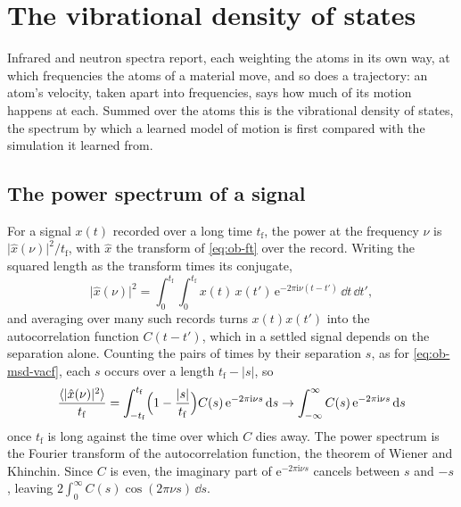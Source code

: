 \section{The vibrational density of states}
\label{sec:ob-vdos}

Infrared and neutron spectra report, each weighting the atoms in its own
way, at which frequencies the atoms of a material move, and so does a
trajectory: an atom's velocity, taken apart
into frequencies, says how much of its motion happens at each. Summed
over the atoms this is the vibrational density of states, the spectrum
by which a learned model of motion is first compared with the simulation
it learned from\cite{Thiemann2026}.

\subsection*{The power spectrum of a signal}

For a signal $x(t)$ recorded over a long time $t_{\mathrm f}$, the power at the
frequency $\nu$ is $\lvert\hat x(\nu)\rvert^2/t_{\mathrm f}$, with $\hat x$ the
transform of \cref{eq:ob-ft} over the record. Writing the squared length
as the transform times its conjugate,
\begin{equation*}
   \lvert\hat x(\nu)\rvert^2 = \int_0^{t_{\mathrm f}}\!\!\int_0^{t_{\mathrm f}}x(t)\,x(t')\,
   \mathrm{e}^{-2\pi\mathrm{i}\nu(t - t')}\,\dd t\,\dd t' ,
\end{equation*}
and averaging over many such records turns $x(t)x(t')$ into the
autocorrelation function $C(t - t')$, which in a settled signal depends on
the separation alone. Counting the pairs of times by their separation
$s$, as for \cref{eq:ob-msd-vacf}, each $s$ occurs over a length $t_{\mathrm f} -
\lvert s\rvert$, so
\begin{equation*}
   \frac{\langle \lvert\hat x(\nu)\rvert^2 \rangle}{t_{\mathrm f}} = \int_{-t_{\mathrm f}}^{t_{\mathrm f}}\Bigl(1 -
   \frac{\lvert s\rvert}{t_{\mathrm f}}\Bigr)C(s)\,\mathrm{e}^{-2\pi\mathrm{i}\nu s}\,
   \mathrm{d} s \to \int_{-\infty}^{\infty}C(s)\,\mathrm{e}^{-2\pi\mathrm{i}\nu s}
   \,\mathrm{d} s
\end{equation*}
once $t_{\mathrm f}$ is long against the time over which $C$ dies away. The power
spectrum is the Fourier transform of the autocorrelation function, the
theorem of Wiener and Khinchin. Since $C$ is even, the imaginary part of
$\mathrm{e}^{-2\pi\mathrm{i}\nu s}$ cancels between $s$ and $-s$, leaving
$2\int_0^\infty C(s)\cos(2\pi\nu s)\,\dd s$.

